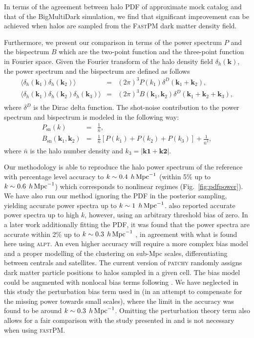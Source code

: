 \documentclass[english,usenatbib]{mn2e}
\newcommand{\ba}{\begin{eqnarray}}
\newcommand{\ea}{\end{eqnarray}}
\newcommand{\hperm}{\,h\,{\rm Mpc}^{-1}}
\begin{document}
In terms of the agreement between halo PDF of approximate mock catalog and that of the BigMultiDark simulation, we find that significant improvement can be achieved when halos are sampled from the \textsc{FastPM} dark matter density field. 

Furthermore, we present our comparison in terms of the power spectrum $P$ and the bispectrum $B$ which are the two-point function and the three-point function in Fourier space. Given the Fourier transform of the halo density field $\delta_{h}(\mathbf{k})$, the power spectrum and the bispectrum are defined as follows
\ba
\langle \delta_{h}(\mathbf{k}_{1}) \delta_{h}(\mathbf{k}_{2})\rangle &=& (2\pi)^{3} P(k_{1}) \delta^{D}(\mathbf{k}_{1}+\mathbf{k}_{2}), \\
\langle \delta_{h}(\mathbf{k}_{1}) \delta_{h}(\mathbf{k}_{2}) \delta_{h}(\mathbf{k}_{3})\rangle &=& (2\pi)^{3} B(\mathbf{k}_{1},\mathbf{k}_{2}) \delta^{D}(\mathbf{k}_{1}+\mathbf{k}_{2}+\mathbf{k}_{3}), \nonumber \\
\ea
where $\delta^{D}$ is the Dirac delta function. The shot-noise contribution to the power spectrum and bispectrum is modeled in the following way:
\ba
P_{\mathrm{sn}}(k) &=& \frac{1}{\bar{n}}, \\
B_{\mathrm{sn}}(\mathbf{k}_{1},\mathbf{k}_{2}) &=& \frac{1}{\bar{n}} [P(k_{1}) + P(k_{2}) + P(k_{3})] + \frac{1}{\bar{n}^{2}},
\ea
where $\bar{n}$ is the halo number density and $k_{3}=|\mathbf{k1}+\mathbf{k2}|$.

Our methodology is able to reproduce the halo power spectrum of the reference with percentage level accuracy to $k \sim 0.4 \; \hperm$ (within 5\% up to $k \sim 0.6 \; \hperm$) which corresponds to  nonlinear regimes (Fig.~\ref{fig:pdfpower}). We have also run our method ignoring the PDF in the posterior sampling, yielding accurate power spectra up to $k\sim 1 \; \hperm$. \citet[][]{kitaura2014} also reported accurate power spectra up to high $k$, however, using an arbitrary threshold bias of zero. In a later work additionally fitting the PDF, it was found that the power spectra are accurate within 2\% up to $k\sim 0.3 \; \hperm$ \citep[][]{kitaura2015}, in agreement with what is found here using \textsc{alpt}. 
An even higher accuracy will require a more  complex bias model and a proper modelling of the clustering on sub-Mpc scales, differentiating between centrals and satellites. The current version of \textsc{patchy} randomly assigns dark matter particle positions to halos sampled in a given cell.
The bias model could be augmented with nonlocal bias terms following \citet[][]{mcdonald2009}. We have neglected in this study the perturbation bias term used in \citet{kitaura2016} (in an attempt to compensate for the missing power towards small scales), where the limit in the accuracy was found to be around $k\sim 0.3 \; \hperm$. Omitting the perturbation theory term also allows for a fair comparison with the study presented in \citet[][]{kitaura2015} and is not necessary when using \textsc{fastPM}. 
\end{document}
